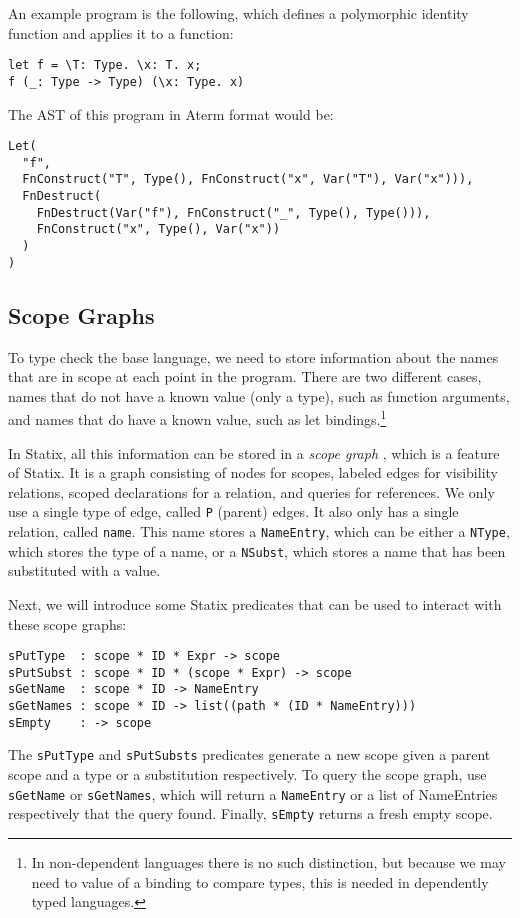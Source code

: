 \documentclass[a4paper,UKenglish,cleveref, autoref, thm-restate]{oasics-v2021}
\begin{document}
An example program is the following, which defines a polymorphic identity function and applies it to a function:

\begin{lstlisting}
let f = \T: Type. \x: T. x;
f (_: Type -> Type) (\x: Type. x)
\end{lstlisting}
The AST of this program in Aterm format\cite{aterm} would be:
\begin{lstlisting}
Let(
  "f", 
  FnConstruct("T", Type(), FnConstruct("x", Var("T"), Var("x"))),
  FnDestruct(
	FnDestruct(Var("f"), FnConstruct("_", Type(), Type())),
	FnConstruct("x", Type(), Var("x"))
  )
)
\end{lstlisting}



\subsection{Scope Graphs}
\label{sec:coc-scopes}

To type check the base language, we need to store information about the names that are in scope at each point in the program. There are two different cases, names that do not have a known value (only a type), such as function arguments, and names that do have a known value, such as let bindings.\footnote{In non-dependent languages there is no such distinction, but because we may need to value of a binding to compare types, this is needed in dependently typed languages.}

In Statix, all this information can be stored in a \emph{scope graph} \cite{scope_graphs}, which is a feature of Statix. It is a graph consisting of nodes for scopes, labeled edges for visibility relations, scoped declarations for a relation, and queries for references. We only use a single type of edge, called \verb|P| (parent) edges. It also only has a single relation, called \verb|name|. This name stores a \verb|NameEntry|, which can be either a \verb|NType|, which stores the type of a name, or a \verb|NSubst|, which stores a name that has been substituted with a value. 

Next, we will introduce some Statix predicates that can be used to interact with these scope graphs:

\begin{lstlisting}
sPutType  : scope * ID * Expr -> scope
sPutSubst : scope * ID * (scope * Expr) -> scope
sGetName  : scope * ID -> NameEntry
sGetNames : scope * ID -> list((path * (ID * NameEntry)))
sEmpty    : -> scope
\end{lstlisting}
The \verb|sPutType| and \verb|sPutSubsts| predicates generate a new scope given a parent scope and a type or a substitution respectively. To query the scope graph, use \verb|sGetName| or \verb|sGetNames|, which will return a \verb|NameEntry| or a list of NameEntries respectively that the query found. Finally, \verb|sEmpty| returns a fresh empty scope.
\end{document}
